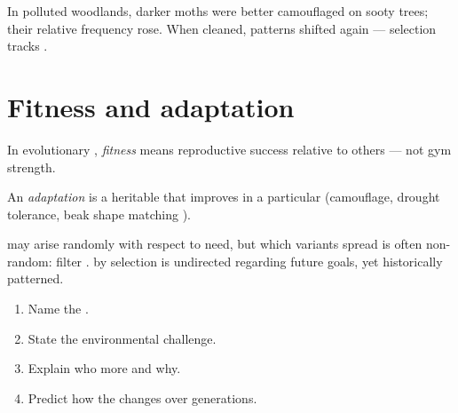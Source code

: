 \begin{example}\label{ex:g9:selection:moth}
In polluted woodlands, darker moths were better camouflaged on sooty
trees; their relative frequency rose. When  cleaned, patterns shifted
again --- selection tracks .
\end{example}

\section{Fitness and adaptation}

\begin{definition}[Fitness]\label{def:g9:selection:fitness}
In evolutionary , \emph{fitness} means
reproductive success relative to others --- not gym strength.
\end{definition}

\begin{definition}[Adaptation]\label{def:g9:selection:adapt}
An \emph{adaptation} is a heritable  that improves
 in a particular  (camouflage, drought tolerance, beak
shape matching ).
\end{definition}

\begin{proposition}\label{prop:g9:selection:not-random}
 may arise randomly with respect to need, but which variants
spread is often non-random:  filter .  by
selection is undirected regarding future goals, yet historically
patterned.
\end{proposition}
\admitted

\begin{method}\label{met:g9:selection:apply}
\begin{enumerate}
  \item Name the  .
  \item State the environmental challenge.
  \item Explain who  more  and why.
  \item Predict how the  changes over generations.
\end{enumerate}
\end{method}

